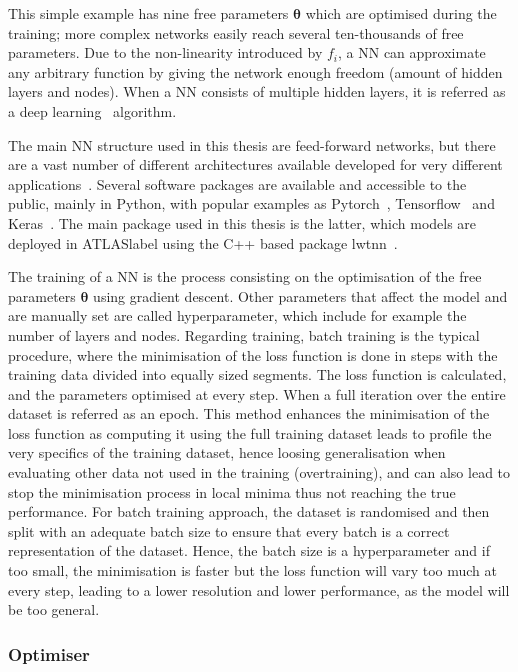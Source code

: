 This simple example has nine free parameters $\boldsymbol{\theta}$ which are optimised during the training; more complex networks easily reach several ten-thousands of free parameters. Due to the non-linearity introduced by $f_i$, a NN can approximate any arbitrary function by giving the network enough freedom (amount of hidden layers and nodes). When a NN consists of multiple hidden layers, it is referred as a deep learning~\cite{Goodfellow-et-al-2016} algorithm.

The main NN structure used in this thesis are feed-forward networks, but there are a vast number of different architectures available developed for very different applications~\cite{livingreview}. Several software packages are available and accessible to the public,  mainly in Python, with popular examples as Pytorch~\cite{NEURIPS2019_9015}, Tensorflow~\cite{tensorflow2015-whitepaper} and Keras~\cite{chollet2015keras}. The main package used in this thesis is the latter, which models are deployed in \acrshort{ATLASlabel} using the C++ based package lwtnn~\cite{lwtnn}.

The training of a NN is the process consisting on the optimisation of the free parameters $\boldsymbol{\theta}$ using gradient descent. Other parameters that affect the model and are manually set are called hyperparameter, which include for example the number of layers and nodes. Regarding training, batch training is the typical procedure, where the minimisation of the loss function is done in steps with the training data divided into equally sized segments. The loss function is calculated, and the parameters optimised at every step. When a full iteration over the entire dataset is referred as an epoch. This method enhances the minimisation of the loss function as computing it using the full training dataset leads to profile the very specifics of the training dataset, hence loosing generalisation when evaluating other data not used in the training (overtraining), and can also lead to stop the minimisation process in local minima thus not reaching the true performance. For batch training approach, the dataset is randomised and then split with an adequate batch size to ensure that every batch is a correct representation of the dataset. Hence, the batch size is a hyperparameter and if too small, the minimisation is faster but the loss function will vary too much at every step, leading to a lower resolution and lower performance, as the model will be too general. 

\subsubsection{Optimiser}

